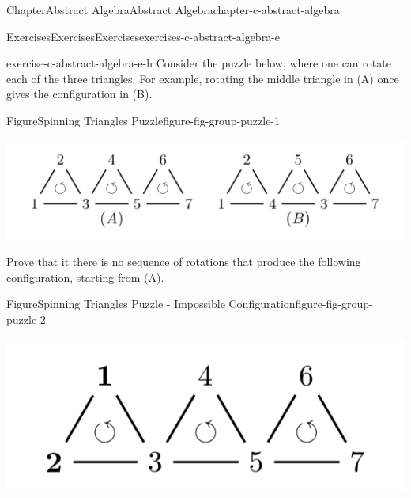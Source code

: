 \documentclass[oneside,10pt,]{book}
\numberwithin{equation}{section}
\begin{document}
\begin{chapterptx}{Chapter}{Abstract Algebra}{}{Abstract Algebra}{}{}{chapter-c-abstract-algebra}
\begin{exercises-section}{Exercises}{Exercises}{}{Exercises}{}{}{exercises-c-abstract-algebra-e}
\begin{divisionexercise}{7}{}{}{exercise-c-abstract-algebra-e-h}%
Consider the puzzle below, where one can rotate each of the three triangles. For example, rotating the middle triangle in (A) once gives the configuration in (B).%
\begin{figureptx}{Figure}{Spinning Triangles Puzzle}{figure-fig-group-puzzle-1}{}%
\begin{image}{0}{1}{0}{}%
\includegraphics[width=\linewidth]{images/fig-group-puzzle-1.png}
\end{image}%
\tcblower
\end{figureptx}%
Prove that it there is no sequence of rotations that produce the following configuration, starting from (A).%
\begin{figureptx}{Figure}{Spinning Triangles Puzzle - Impossible Configuration}{figure-fig-group-puzzle-2}{}%
\begin{image}{0}{1}{0}{}%
\includegraphics[width=\linewidth]{images/fig-group-puzzle-2.png}
\end{image}%
\tcblower
\end{figureptx}%
\end{divisionexercise}%
\end{exercises-section}
\end{chapterptx}
%
%
\typeout{************************************************}
\typeout{************************************************}
%
\end{document}
